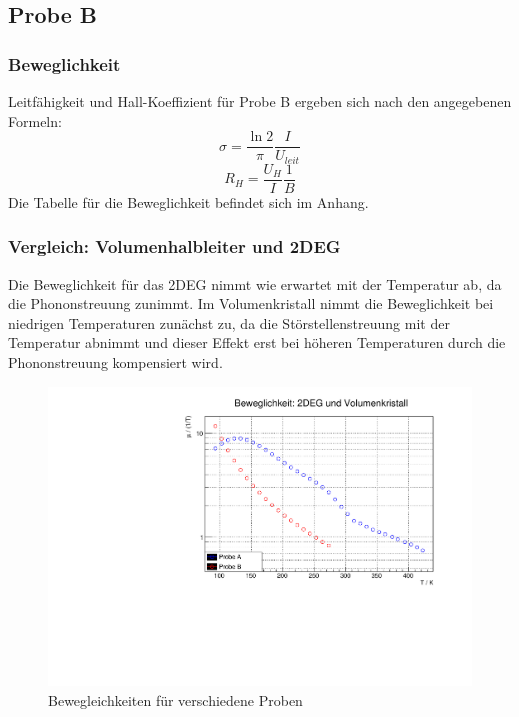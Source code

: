 \subsection{Probe B}
\subsubsection{Beweglichkeit}
\FloatBarrier
Leitfähigkeit und Hall-Koeffizient für Probe B ergeben sich nach den angegebenen Formeln:
$$\sigma = \frac{\ln 2}{\pi} \frac{I}{U_{leit}}$$
$$R_H = \frac{U_H}{I} \frac{1}{B}$$
Die Tabelle für die Beweglichkeit befindet sich im Anhang.

\subsubsection{Vergleich: Volumenhalbleiter und 2DEG}
\FloatBarrier

Die Beweglichkeit für das 2DEG nimmt wie erwartet mit der Temperatur ab, da die Phononstreuung zunimmt. Im Volumenkristall nimmt die Beweglichkeit bei niedrigen Temperaturen zunächst zu, da die Störstellenstreuung mit der Temperatur abnimmt und dieser Effekt erst bei höheren Temperaturen durch die Phononstreuung kompensiert wird.

\begin{figure}
\label{fig:bbew}
\centering
\includegraphics[scale = 0.5]{../data/B2.pdf}
\caption{Bewegleichkeiten für verschiedene Proben}
\end{figure}




